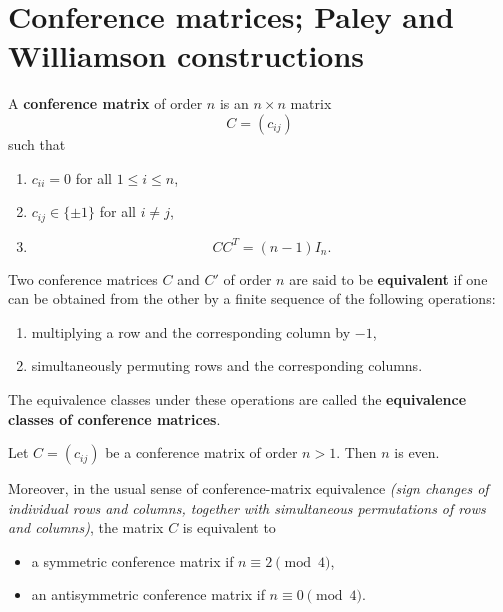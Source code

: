 \documentclass[11pt, a4paper]{ctexrep}
\begin{document}
\section{Conference matrices; Paley and Williamson constructions}

\begin{definition}
    A \textbf{conference matrix} of order \(n\) is an \(n\times n\) matrix
    \[
        C=(c_{ij})
    \]
    such that
    \begin{enumerate}
        \item \(c_{ii}=0\) for all \(1\le i\le n\),
        \item \(c_{ij}\in\{\pm 1\}\) for all \(i\ne j\),
        \item
              \[
                  CC^{T}=(n-1)I_n.
              \]
    \end{enumerate}
\end{definition}

\begin{definition}
    Two conference matrices \(C\) and \(C'\) of order \(n\) are said to be \textbf{equivalent}
    if one can be obtained from the other by a finite sequence of the following operations:
    \begin{enumerate}
        \item multiplying a row and the corresponding column by \(-1\),
        \item simultaneously permuting rows and the corresponding columns.
    \end{enumerate}
    The equivalence classes under these operations are called the \textbf{equivalence classes of conference matrices}.
\end{definition}

\begin{lemma}\label{lem:conference-symmetric-skew}
    Let \(C=(c_{ij})\) be a conference matrix of order \(n>1\). Then \(n\) is even.

    Moreover, in the usual sense of conference-matrix equivalence
    \emph{(sign changes of individual rows and columns, together with simultaneous
        permutations of rows and columns)}, the matrix \(C\) is equivalent to
    \begin{itemize}
        \item a symmetric conference matrix if \(n\equiv 2\pmod 4\),
        \item an antisymmetric conference matrix if \(n\equiv 0\pmod 4\).
    \end{itemize}
\end{lemma}
\end{document}
